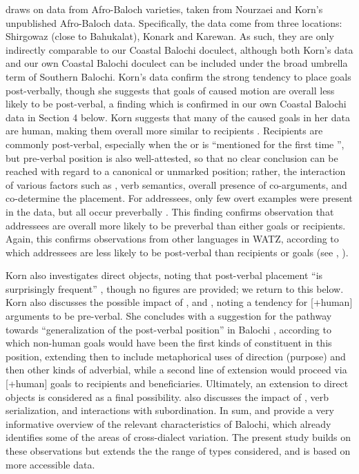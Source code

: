 \documentclass[output=paper,colorlinks,citecolor=brown,draftmode]{langscibook}
\begin{document}
\begin{sloppypar}
\citet[114]{Korn2022Targets} draws on data from Afro-Baloch varieties, taken from Nourzaei and Korn's unpublished Afro-Baloch data. Specifically, the data come from three locations: Shirgowaz (close to Bahukalat), Konark and Karewan. As such, they are only indirectly comparable to our Coastal Balochi doculect, although both Korn's data and our own Coastal Balochi doculect can be included under the broad umbrella term of Southern Balochi. Korn's data confirm the strong tendency to place goals post-verbally, though she suggests that goals of caused motion are overall less likely to be post-verbal, a finding which is confirmed in our own Coastal Balochi data in Section 4 below. Korn suggests that many of the caused goals in her data are human, making them overall more similar to recipients \citep[104]{Korn2022Targets}. Recipients are commonly post-verbal, especially when the  or  is ``mentioned for the first time ''\citep[105]{Korn2022Targets}, but pre-verbal position is also well-attested, so that no clear conclusion can be reached with regard to a canonical or unmarked position; rather, the interaction of various factors such as , verb semantics, overall presence of co-arguments, and  co-determine the placement. For addressees, only few overt examples were present in the data, but all occur preverbally \citep[107]{Korn2022Targets}. This finding confirms  observation that addressees are overall more likely to be preverbal than either goals or recipients. Again, this confirms observations from other languages in WATZ, according to which addressees are less likely to be post-verbal than recipients or goals (see , ).
\end{sloppypar}

Korn also investigates direct objects, noting that post-verbal placement ``is surprisingly frequent'' \citep[113]{Korn2022Targets}, though no figures are provided; we return to this below. Korn also discusses the possible impact of , and , noting a tendency for [+human] arguments to be pre-verbal. She concludes with a suggestion for the pathway towards ``generalization of the post-verbal position'' in Balochi \citep[118]{Korn2022Targets}, according to which non-human goals would have been the first kinds of constituent in this position, extending then to include metaphorical uses of direction (purpose) and then other kinds of adverbial, while a second line of extension would proceed via [+human] goals to recipients and beneficiaries. Ultimately, an extension to direct objects is considered as a final possibility. \citet{Korn2022Targets} also discusses the impact of , verb serialization, and interactions with subordination. In sum, \citet{Jahani2018Post-verbal} and \citet{Korn2022Targets} provide a very informative overview of the relevant characteristics of Balochi, which already identifies some of the areas of cross-dialect variation. The present study builds on these observations but extends the the range of  types considered, and is based on more accessible data.
\end{document}
